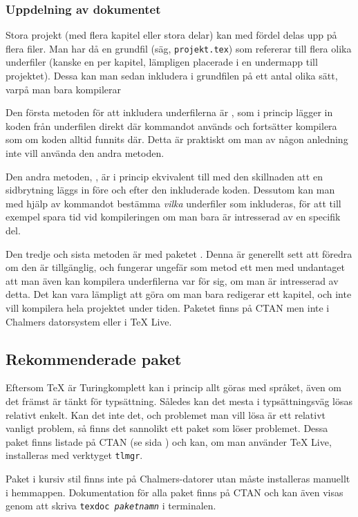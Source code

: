 \documentclass[lang=sv,ptsize=10pt,font=none,nomath,titles=bf,../../a4.tex]{subfiles}
\begin{document}
\subsubsection{Uppdelning av dokumentet}
Stora projekt (med flera kapitel eller stora delar) kan med fördel delas
upp på flera filer. Man har då en grundfil (säg, \texttt{projekt.tex}) som
refererar till flera olika underfiler (kanske en per kapitel, lämpligen
placerade i en undermapp till projektet). Dessa kan man sedan inkludera
i grundfilen på ett antal olika sätt, varpå man bara kompilerar

Den första metoden för att inkludera underfilerna är , som i
princip lägger in koden från underfilen direkt där kommandot används och
fortsätter kompilera som om koden alltid funnits där. Detta är praktiskt
om man av någon anledning inte vill använda den andra metoden.

\newpage
Den andra metoden, , är i princip ekvivalent till 
med den skillnaden att en sidbrytning läggs in före och efter den 
inkluderade koden. Dessutom kan man med hjälp av kommandot
 bestämma \emph{vilka} underfiler som inkluderas, för att
till exempel spara tid vid kompileringen om man bara är intresserad av en
specifik del.

Den tredje och sista metoden är med paketet . Denna är
generellt sett att föredra om den är tillgänglig, och fungerar ungefär som
metod ett men med undantaget att man även kan kompilera underfilerna
var för sig, om man är intresserad av detta. Det kan vara lämpligt att
göra om man bara redigerar ett kapitel, och inte vill kompilera hela
projektet under tiden. Paketet  finns på CTAN men inte i
Chalmers datorsystem eller i \TeX{} Live.

\subsection{Rekommenderade paket}
Eftersom \TeX{} är Turingkomplett kan i princip allt göras med språket,
även om det främst är tänkt för typsättning. Således kan det mesta i 
typsättningsväg lösas relativt enkelt. Kan det inte det, och problemet
man vill lösa är ett relativt vanligt problem, så finns det sannolikt ett
paket som löser problemet. Dessa paket finns listade på CTAN (se sida
\pageref{sec:ctan}) och kan, om man använder \TeX{} Live, installeras
med verktyget \texttt{tlmgr}.

Paket i kursiv stil finns inte på Chalmers-datorer utan måste installeras
manuellt i hemmappen. Dokumentation för alla paket finns på CTAN och kan
även visas genom att skriva \texttt{texdoc \emph{paketnamn}} i terminalen.
\end{document}
